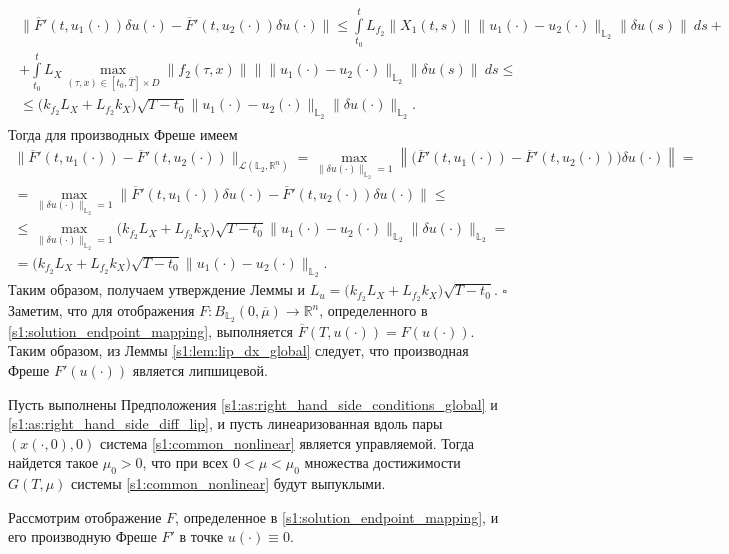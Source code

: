 \documentclass[../main.tex]{subfiles}
\begin{document}
\begin{gather*}
\begin{gathered}
 \Big\| \overline{F}'(t, u_1(\cdot)) \delta u(\cdot) - \overline{F}'(t, u_2(\cdot)) \delta u(\cdot) \Big\| \leqslant
 \int\limits_{t_0}^{t} L_{f_2} \Big\| X_1(t,s) \Big\| \| u_1(\cdot) - u_2(\cdot) \|_{\mathbb{L}_2} \left\| \delta u(s) \right\| \ ds + \\ + 
 \int\limits_{t_0}^{t} L_X \max\limits_{(\tau, x ) \in [t_0, \overline{T}] \times D} \| f_2(\tau,x) \| \Big\| \| u_1(\cdot) - u_2(\cdot) \|_{\mathbb{L}_2} \left\| \delta u(s) \right\| \ ds 
 \leqslant \\ \leqslant 
 \Big( k_{f_2} L_X + L_{f_2} k_X \Big) \sqrt{T - t_0} \| u_1(\cdot) - u_2(\cdot) \|_{\mathbb{L}_2} \| \delta u(\cdot) \|_{\mathbb{L}_2}.
\end{gathered}
\end{gather*}
Тогда для производных Фреше имеем
\begin{gather*}
	 \Big\| \overline{F}'(t, u_1(\cdot)) - \overline{F}'(t, u_2(\cdot)) \Big\|_{\mathcal{L}(\mathbb{L}_2, \mathbb{R}^n)} = 
	 \max\limits_{\|\delta u(\cdot)\|_{\mathbb{L}_2} = 1} \left\| \Big( \overline{F}'(t, u_1(\cdot)) - \overline{F}'(t, u_2(\cdot)) \Big) \delta u(\cdot) \right\| = \\ =
	 \max\limits_{\|\delta u(\cdot)\|_{\mathbb{L}_2} = 1} \Big\| \overline{F}'(t, u_1(\cdot)) \delta u(\cdot) - \overline{F}'(t, u_2(\cdot)) \delta u(\cdot) \Big\| \leqslant \\ \leqslant \max\limits_{\|\delta u(\cdot)\|_{\mathbb{L}_2} = 1} \Big( k_{f_2} L_X + L_{f_2} k_X \Big) \sqrt{T - t_0} \| u_1(\cdot) - u_2(\cdot) \|_{\mathbb{L}_2} \| \delta u(\cdot) \|_{\mathbb{L}_2} = \\ =
	 \Big( k_{f_2} L_X + L_{f_2} k_X \Big) \sqrt{T - t_0} \| u_1(\cdot) - u_2(\cdot) \|_{\mathbb{L}_2}.
\end{gather*}
Таким образом, получаем утверждение Леммы и $L_u = \Big( k_{f_2} L_X + L_{f_2} k_X \Big) \sqrt{T - t_0} $.
\hfill$\square$\\[1ex]%
 
Заметим, что для отображения $F: B_{\mathbb{L}_2}(0,\overline{\mu}) \to \mathbb{R}^n$, определенного в \eqref{s1:solution_endpoint_mapping}, выполняется $\overline{F}(T, u(\cdot)) = F(u(\cdot))$.
Таким образом, из Леммы \ref{s1:lem:lip_dx_global} следует, что производная Фреше $F'(u(\cdot)) $ является липшицевой. 
 
\begin{theorem}\label{s1:th:small_control_convexity}
 Пусть выполнены Предположения \ref{s1:as:right_hand_side_conditions_global} и \ref{s1:as:right_hand_side_diff_lip}, и пусть линеаризованная вдоль пары $\left( x(\cdot,0),0\right) $ система \eqref{s1:common_nonlinear} является управляемой.
 Тогда найдется такое $\mu_0 > 0$, что при всех $0 < \mu < \mu_0 $ множества достижимости $G(T, \mu)$ системы \eqref{s1:common_nonlinear} будут выпуклыми.
\end{theorem}
\doc
Рассмотрим отображение $F$, определенное в \eqref{s1:solution_endpoint_mapping}, и его производную Фреше $F'$ в точке $u(\cdot) \equiv 0$. 
 
\end{document}
